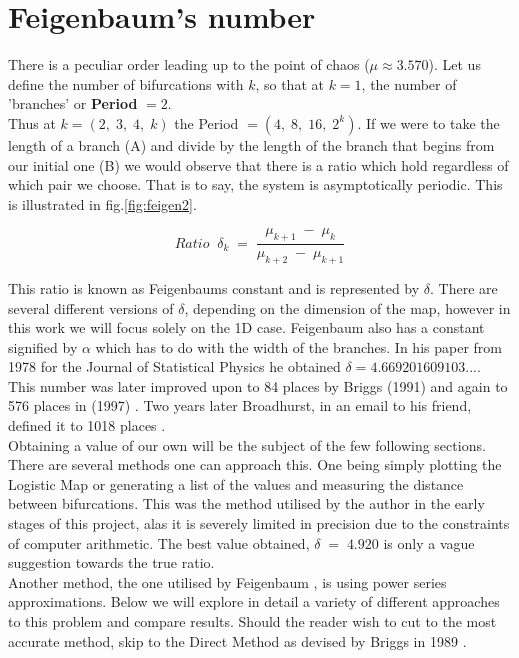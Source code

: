 \section{Feigenbaum's number}

There is a peculiar order leading up to the point of chaos ($\mu \approx 3.570$).
Let us define the number of bifurcations with $k$, so that at $k=1$, the number of
'branches' or \textbf{Period} $= 2$.\\
Thus at $k = (2,\;3,\;4,\;k)$ the Period $= (4,\;8,\;16,\;2^k)$.
If we were to take the length of a branch (A) and divide by the length
of the branch that begins from our initial one (B) we would observe that there is 
a ratio which hold regardless of which pair we choose. That is to say, the system
 is asymptotically periodic. This is illustrated in fig.\ref{fig:feigen2}.

\begin{equation}
    \label{eq:ratio}
    Ratio\; \; \delta_k\;=\; \frac{\mu_{k+1}\;-\;\mu_{k}}{\mu_{k+2}\;-\;\mu_{k+1}}
\end{equation}

This ratio is known as Feigenbaums constant and is represented by $\delta$. There
are several different versions of $\delta$, depending on the dimension of the map,
however in this work we will focus solely on the 1D case. Feigenbaum also has a 
constant signified by $\alpha$ which has to do with the width of the branches.
In his paper from 1978 for the Journal of Statistical Physics \cite{feigenbaumconstant} he obtained 
$\delta = 4.669201609103...$. This number was later improved upon to 84 places by Briggs (1991) \cite{briggsconstant}
and again to 576 places in (1997) \cite{briggsconstant2}. Two years later Broadhurst, in an email to his friend,
defined it to 1018 places \cite{Broadhurst}.\\

Obtaining a value of our own will be the subject of the few following sections.
There are several methods one can approach this. One being simply plotting the 
Logistic Map or generating a list of the values and measuring the distance between
bifurcations. This was the method utilised by the author in the early stages of this
project, alas it is severely limited in precision due to the constraints of computer
arithmetic. The best value obtained, $\delta\; =\; 4.920$ is only a vague suggestion towards the true ratio.\\
Another method, the one utilised by Feigenbaum \cite{feigenbaumconstant}, is using
power series approximations. Below we will explore in detail a variety of different
approaches to this problem and compare results. Should the reader wish to cut to the
most accurate method, skip to the Direct Method as devised by Briggs in 1989 \cite{briggspc}.

